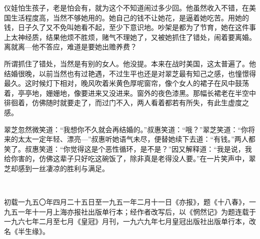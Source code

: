 \par 仪娃怕生孩子，老是怕会有，就为这个不知道闹过多少回。他虽然收入不错，在美国生活程度高，当然不够她用的。她自己的钱不让她花，是逼着她吃苦。用她的钱，日子久了又不免叫她看不起，至少下意识地。吵架是都为了节育，她在这件事上太神经质，结果他烦不胜烦，赌气不理她了，又被她抓住了错处，闹着要离婚。离就离—他不答应，难道是要她出赡养费？
\par 所谓抓住了错处，当然是有别的女人。他没提。本来在战时美国，这太普遍了。他结婚很晚，以前当然也有过艳遇，不过生平也还是对翠芝最有知己之感，也憧憬得最久。这时候灯下相对，晚风吹着米黄色厚呢窗帘，像个女人的裙子在风中鼓荡着，亭亭地，姗姗地，像要进来又没进来。窗外的夜色漆黑。那幅长裙老在半空中徘徊着，仿佛随时就要走了，而过门不入，两人看着都若有所失，有此生虚度之感。
\par 翠芝忽然微笑道：“我想你不久就会再结婚的。”叔惠笑道：“哦？”翠芝笑道：“你将来的太太一定年轻、漂亮—”叔惠听她语气未尽，便替她续下去道：“有钱。”两人都笑了。叔惠笑道：“你觉得这是个恶性循环，是不是？”因又解释道：“我是说，我给你害的，仿佛这辈子只好吃这碗饭了，除非真是老得没人要。”在一片笑声中，翠芝却感到一丝凄凉的胜利与满足。
\par  
\par *初载一九五〇年四月二十五日至一九五一年二月十一日《亦报》，题《十八春》，一九五一年十一月上海亦报社出版单行本；经作者改写后，以《惘然记》为题连载于一九六七年二月至七月《皇冠》月刊，一九六九年七月皇冠出版社出版单行本，改名《半生缘》。

































